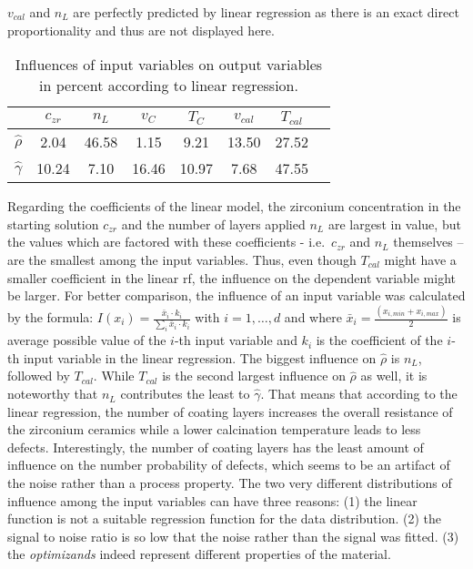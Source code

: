 $v_{cal}$ and $n_L$ are perfectly predicted by linear regression as there is an exact direct proportionality and thus are not displayed here. 
%
\begin{table}[htb]
	\center
	\begin{tabular}{cccccccc}
		        & $c_{zr}$      & $n_L$     & $v_{C}$      & $T_{C}$      & $v_{cal}$     & $T_{cal}$\\
				\hline\hline
				$\hat\rho$          &2.04   &46.58  &1.15   &9.21   &13.50  &27.52\\
				$\hat\gamma$        &10.24  &7.10   &16.46  &10.97  &7.68   &47.55\\
				\hline\hline
	\end{tabular}
	\label{tab:lin-reg-influence}
	\caption{Influences of input variables on output variables in percent according to linear regression.}
\end{table}

%
Regarding the coefficients of the linear model, the zirconium concentration in the starting solution $c_{zr}$ and the number of layers applied $n_L$ are largest in value, but the values which are factored with these coefficients - i.e.\ $c_{zr}$ and $n_L$ themselves -- are the smallest among the input variables. 
Thus, even though $T_{cal}$ might have a smaller coefficient in the linear \gls{rf}, the influence on the dependent variable might be larger. 
For better comparison, the influence of an input variable was calculated by the formula: $I(x_i)=\frac{\bar{x}_i \cdot k_i}{\sum_i \bar{x}_i \cdot k_i}$ with $i=1,\dots,d $ and where $\bar{x}_i= \frac{(x_{i,min}+x_{i,max})}{2}$ is average possible value of the $i$-th input variable and $k_i$ is the coefficient of the $i$-th input variable in the linear regression. 
The biggest influence on $\hat\rho$ is  $n_L$, followed by $T_{cal}$. 
While $T_{cal}$ is the second largest influence on $\hat\rho$ as well, it is noteworthy that $n_L$ contributes the least to $\hat\gamma$. 
That means that according to the linear regression, the number of coating layers increases the overall resistance of the zirconium ceramics while a lower calcination temperature leads to less defects. 
Interestingly, the number of coating layers has the least amount of influence on the number probability of defects, which seems to be an artifact of the noise rather than a process property. 
The two very different distributions of influence among the input variables can have three reasons:
(1) the linear function is not a suitable regression function for the data distribution.
(2) the signal to noise ratio is so low that the noise rather than the signal was fitted.
(3) the \textit{optimizands} indeed represent different properties of the material.
%


